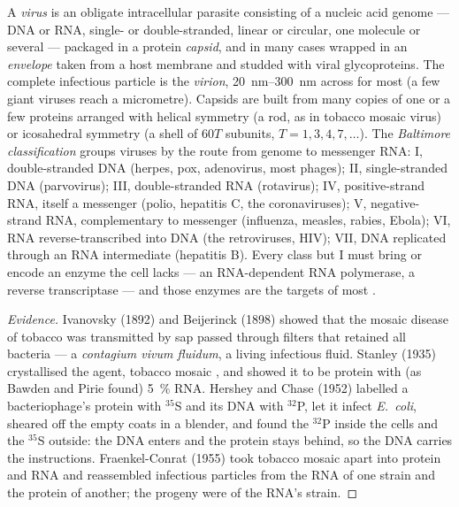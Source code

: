 \begin{definition}[Virus]\label{def:b3:virology:virus}
A \emph{virus} is an obligate intracellular parasite consisting of a
nucleic acid genome --- DNA or RNA, single- or double-stranded, linear
or circular, one molecule or several --- packaged in a protein
\emph{capsid}, and in many cases wrapped in an \emph{envelope} taken
from a host membrane and studded with viral glycoproteins. The complete
infectious particle is the \emph{virion}, \qtyrange{20}{300}{nm} across
for most (a few giant viruses reach a micrometre). Capsids are built
from many copies of one or a few proteins arranged with helical
symmetry (a rod, as in tobacco mosaic virus) or icosahedral symmetry (a
shell of $60T$ subunits, $T = 1, 3, 4, 7,\dots$). The \emph{Baltimore
classification} groups viruses by the route from genome to messenger
RNA: I, double-stranded DNA (herpes, pox, adenovirus, most phages); II,
single-stranded DNA (parvovirus); III, double-stranded RNA (rotavirus);
IV, positive-strand RNA, itself a messenger (polio, hepatitis C, the
coronaviruses); V, negative-strand RNA, complementary to messenger
(influenza, measles, rabies, Ebola); VI, RNA reverse-transcribed into
DNA (the retroviruses, HIV); VII, DNA replicated through an RNA
intermediate (hepatitis B). Every class but I must bring or encode an
enzyme the cell lacks --- an RNA-dependent RNA polymerase, a reverse
transcriptase --- and those enzymes are the targets of most .
\end{definition}

\begin{proof}[Evidence]
Ivanovsky (1892) and Beijerinck (1898) showed that the mosaic disease of
tobacco was transmitted by sap passed through filters that retained all
bacteria --- a \emph{contagium vivum fluidum}, a living infectious
fluid. Stanley (1935) crystallised the agent, tobacco mosaic , and
showed it to be protein with (as Bawden and Pirie found) \qty{5}{\%}
RNA. Hershey and Chase (1952) labelled a bacteriophage's protein with
$^{35}$S and its DNA with $^{32}$P, let it infect \emph{E.~coli},
sheared off the empty coats in a blender, and found the $^{32}$P inside
the cells and the $^{35}$S outside: the DNA enters and the protein
stays behind, so the DNA carries the instructions. Fraenkel-Conrat
(1955) took tobacco mosaic  apart into protein and RNA and
reassembled infectious particles from the RNA of one strain and the
protein of another; the progeny were of the RNA's strain.
\end{proof}

